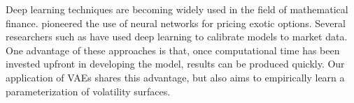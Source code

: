 \documentclass[12pt]{article}
\begin{document}


Deep learning techniques are becoming widely used in the field of mathematical finance.  \citet{ferguson} pioneered the use of neural networks for pricing exotic options. Several researchers such as \citet{hernandez, deep_calibration, deep_rough_calibration} have used deep learning to calibrate models to market data. One advantage of these approaches is that, once computational time has been invested upfront in developing the model, results can be produced quickly. Our application of VAEs shares this advantage, but also aims to empirically learn a parameterization of volatility surfaces. 
\end{document}
